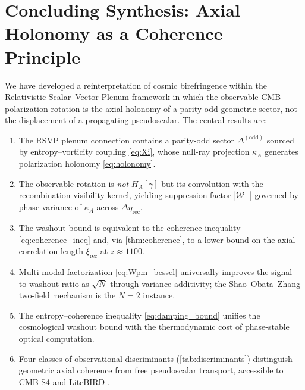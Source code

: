 \documentclass[12pt]{article}
\theoremstyle{definition}
\newcommand{\kA}{\kappa_A}
\newcommand{\Wrec}{\Delta\eta_{\mathrm{rec}}}
\newcommand{\xirec}{\xi_{\mathrm{rec}}}
\newcommand{\Wpm}{\mathcal{W}_\pm}
\begin{document}
\section{Concluding Synthesis: Axial Holonomy as a Coherence Principle}
\label{sec:conclusion}

We have developed a reinterpretation of cosmic birefringence within the
Relativistic Scalar--Vector Plenum framework in which the observable CMB
polarization rotation is the axial holonomy of a parity-odd geometric sector,
not the displacement of a propagating pseudoscalar.
The central results are:

\begin{enumerate}[itemsep=3pt,leftmargin=1.8em]
  \item The RSVP plenum connection contains a parity-odd sector
        $\Delta^{(\mathrm{odd})}$ sourced by entropy--vorticity coupling
        \eqref{eq:Xi}, whose null-ray projection $\kA$ generates
        polarization holonomy \eqref{eq:holonomy}.
  \item The observable rotation is \emph{not} $H_A[\gamma]$ but its
        convolution with the recombination visibility kernel, yielding
        suppression factor $|\Wpm|$ governed by phase variance of $\kA$
        across $\Wrec$.
  \item The washout bound is equivalent to the coherence inequality
        \eqref{eq:coherence_ineq} and, via
        \cref{thm:coherence}, to a lower bound on the axial correlation
        length $\xirec$ at $z\approx1100$.
  \item Multi-modal factorization \eqref{eq:Wpm_bessel} universally
        improves the signal-to-washout ratio as $\sqrt{N}$ through
        variance additivity; the Shao--Obata--Zhang two-field mechanism
        \cite{ShaoObataZhang2025} is the $N=2$ instance.
  \item The entropy--coherence inequality \eqref{eq:damping_bound}
        unifies the cosmological washout bound with the thermodynamic
        cost of phase-stable optical computation.
  \item Four classes of observational discriminants
        (\cref{tab:discriminants}) distinguish geometric axial coherence
        from free pseudoscalar transport, accessible to CMB-S4
        \cite{CMBS4} and LiteBIRD \cite{LiteBIRD2022}.
\end{enumerate}
\end{document}
